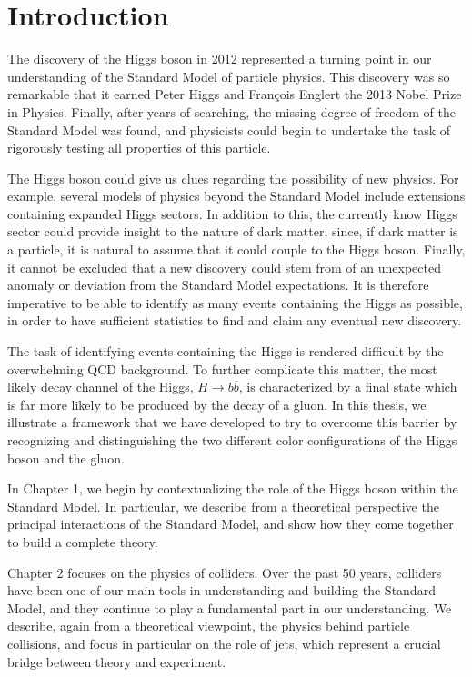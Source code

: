 \documentclass[10pt,a4paper]{book}
\begin{document}
\tableofcontents

\chapter*{Introduction}

The discovery of the Higgs boson in 2012 represented a turning point in our understanding of the Standard Model of particle physics. This discovery was so remarkable that it earned Peter Higgs and Fran\c{c}ois Englert the 2013 Nobel Prize in Physics. Finally, after years of searching, the missing degree of freedom of the Standard Model was found, and physicists could begin to undertake the task of rigorously testing all properties of this particle.

The Higgs boson could give us clues regarding the possibility of new physics. For example, several models of physics beyond the Standard Model include extensions containing expanded Higgs sectors. In addition to this, the currently know Higgs sector could provide insight to the nature of dark matter, since, if dark matter is a particle, it is natural to assume that it could couple to the Higgs boson.  Finally, it cannot be excluded that a new discovery could stem from of an unexpected anomaly or deviation from the Standard Model expectations. It is therefore imperative to be able to identify as many events containing the Higgs as possible, in order to have sufficient statistics to find and claim any eventual new discovery.

The task of identifying events containing the Higgs is rendered difficult by the overwhelming QCD background. To further complicate this matter, the most likely decay channel of the Higgs, $H\rightarrow b\overline{b}$, is characterized by a final state which is far more likely to be produced by the decay of a gluon. In this thesis, we illustrate a framework that we have developed to try to overcome this barrier by recognizing and distinguishing the two different color configurations of the Higgs boson and the gluon.

In Chapter 1, we begin by contextualizing the role of the Higgs boson within the Standard Model. In particular, we describe from a theoretical perspective the principal interactions of the Standard Model, and show how they come together to build a complete theory.

Chapter 2 focuses on the physics of colliders. Over the past 50 years, colliders have been one of our main tools in understanding and building the Standard Model, and they continue to play a fundamental part in our understanding. We describe, again from a theoretical viewpoint, the physics behind particle collisions, and focus in particular on the role of jets, which represent a crucial bridge between theory and experiment.
\end{document}
